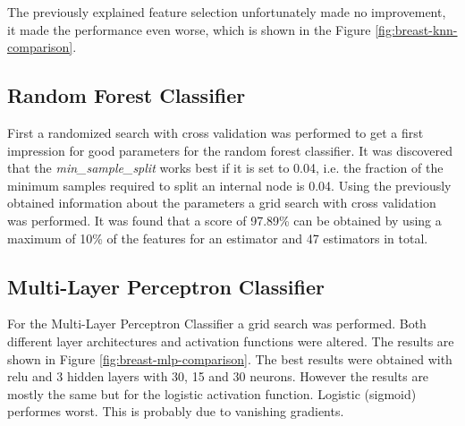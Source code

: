 The previously explained feature selection unfortunately made no improvement, it made the performance even worse, which is shown in the Figure \ref{fig:breast-knn-comparison}.


\subsection{Random Forest Classifier}

First a randomized search with cross validation was performed to get a first impression for good parameters for the random forest classifier.
It was discovered that the \textit{min\_sample\_split} works best if it is set to 0.04, i.e. the fraction of the minimum samples required to split an internal node is 0.04.
Using the previously obtained information about the parameters a grid search with cross validation was performed.
It was found that a score of 97.89\% can be obtained by using a maximum of 10\% of the features for an estimator and 47 estimators in total.


\subsection{Multi-Layer Perceptron Classifier}

For the Multi-Layer Perceptron Classifier a grid search was performed.
Both different layer architectures and activation functions were altered.
The results are shown in Figure \ref{fig:breast-mlp-comparison}.
The best results were obtained with relu and 3 hidden layers with 30, 15 and 30 neurons.
However the results are mostly the same but for the logistic activation function.
Logistic (sigmoid) performes worst.
This is probably due to vanishing gradients.



